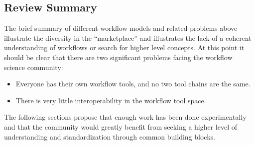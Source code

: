 
\subsection{Review Summary}

The brief summary of different workflow models and related problems above illustrate the
diversity in the ``marketplace'' and illustrates the lack of a coherent understanding of 
workflows or search for higher level concepts. At this point it should be clear that there are 
two significant problems facing the workflow science community:
\begin{itemize}
  \item Everyone has their own workflow tools, and no two tool chains are the same.
  \item There is very little interoperability in the workflow tool space.
\end{itemize} The following sections propose that enough work has
been done experimentally and that the community would greatly benefit from seeking a
higher level of understanding and standardization through common building blocks.
